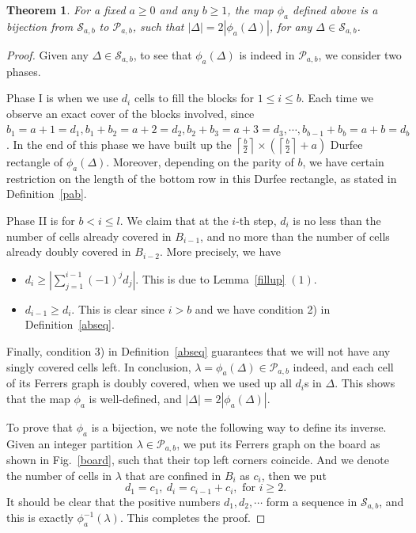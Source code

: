 \documentclass[12pt,reqno]{amsart}
\numberwithin{equation}{section}
\theoremstyle{plain}
\newtheorem{theorem}{Theorem}[section]
\theoremstyle{definition}
\newcommand{\s}{\mathcal{S}}
\newcommand{\p}{\mathcal{P}}
\begin{document}
\begin{theorem}\label{bij}
For a fixed $a\ge 0$ and any $b\ge 1$, the map $\phi_a$ defined above is a bijection from $\s_{a,b}$ to $\p_{a,b}$, such that $|\Delta|=2|\phi_a(\Delta)|$, for any $\Delta\in \s_{a,b}$.
\end{theorem}
\begin{proof}
Given any $\Delta\in \s_{a,b}$, to see that $\phi_a(\Delta)$ is indeed in $\p_{a,b}$, we consider two phases.

Phase I is when we use $d_i$ cells to fill the blocks for $1\le i\le b$. Each time we observe an exact cover of the blocks involved, since $b_1=a+1=d_1, b_1+b_2=a+2=d_2, b_2+b_3=a+3=d_3,\cdots, b_{b-1}+b_b=a+b=d_b$. In the end of this phase we have built up the $\left\lceil \frac{b}{2}\right\rceil \times (\left\lceil \frac{b}{2}\right\rceil+a)$ Durfee rectangle of $\phi_a(\Delta)$. Moreover, depending on the parity of $b$, we have certain restriction on the length of the bottom row in this Durfee rectangle, as stated in Definition~\ref{pab}.

Phase II is for $b<i\le l$. We claim that at the $i$-th step, $d_i$ is no less than the number of cells already covered in $B_{i-1}$, and no more than the number of cells already doubly covered in $B_{i-2}$. More precisely, we have
\begin{itemize}
\item $d_i\ge |\sum_{j=1}^{i-1}(-1)^j d_j|$. This is due to Lemma~\ref{fillup} $(1)$.
\item $d_{i-1}\ge d_i$. This is clear since $i>b$ and we have condition 2) in Definition~\ref{abseq}.
\end{itemize}
Finally, condition 3) in Definition~\ref{abseq} guarantees that we will not have any singly covered cells left. In conclusion, $\lambda=\phi_a(\Delta)\in \p_{a,b}$ indeed, and each cell of its Ferrers graph is doubly covered, when we used up all $d_i$s in $\Delta$. This shows that the map $\phi_a$ is well-defined, and $|\Delta|=2|\phi_a(\Delta)|$.

To prove that $\phi_a$ is a bijection, we note the following way to define its inverse. Given an integer partition $\lambda\in\p_{a,b}$, we put its Ferrers graph on the board as shown in Fig.~\ref{board}, such that their top left corners coincide. And we denote the number of cells in $\lambda$ that are confined in $B_i$ as $c_i$, then we put
$$d_1=c_1,~d_i=c_{i-1}+c_{i}, \text{ for } i\ge 2.$$
It should be clear that the positive numbers $d_1,d_2,\cdots$ form a sequence in $\s_{a,b}$, and this is exactly $\phi_a^{-1}(\lambda)$. This completes the proof.
\end{proof}
\end{document}
